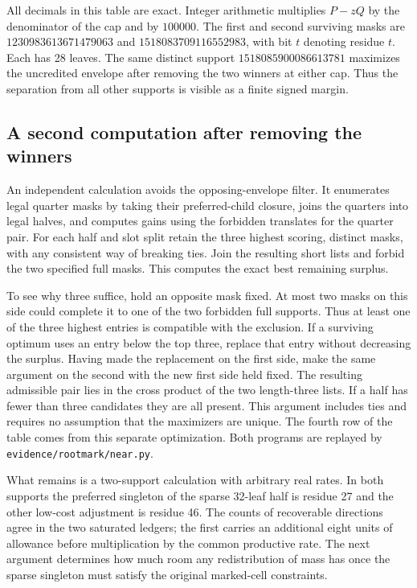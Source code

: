All decimals in this table are exact. Integer arithmetic multiplies \(P-zQ\) by the denominator of the cap and by \(100000\). The first and second surviving masks are \(1230983613671479063\) and \(1518083709116552983\), with bit \(t\) denoting residue \(t\). Each has 28 leaves. The same distinct support \(1518085900086613781\) maximizes the uncredited envelope after removing the two winners at either cap. Thus the separation from all other supports is visible as a finite signed margin.

\subsection{A second computation after removing the winners}

An independent calculation avoids the opposing-envelope filter. It enumerates legal quarter masks by taking their preferred-child closure, joins the quarters into legal halves, and computes gains using the forbidden translates for the quarter pair. For each half and slot split retain the three highest scoring, distinct masks, with any consistent way of breaking ties. Join the resulting short lists and forbid the two specified full masks. This computes the exact best remaining surplus.

To see why three suffice, hold an opposite mask fixed. At most two masks on this side could complete it to one of the two forbidden full supports. Thus at least one of the three highest entries is compatible with the exclusion. If a surviving optimum uses an entry below the top three, replace that entry without decreasing the surplus. Having made the replacement on the first side, make the same argument on the second with the new first side held fixed. The resulting admissible pair lies in the cross product of the two length-three lists. If a half has fewer than three candidates they are all present. This argument includes ties and requires no assumption that the maximizers are unique. The fourth row of the table comes from this separate optimization. Both programs are replayed by \texttt{evidence/rootmark/near.py}.

What remains is a two-support calculation with arbitrary real rates. In both supports the preferred singleton of the sparse 32-leaf half is residue 27 and the other low-cost adjustment is residue 46. The counts of recoverable directions agree in the two saturated ledgers; the first carries an additional eight units of allowance before multiplication by the common productive rate. The next argument determines how much room any redistribution of mass has once the sparse singleton must satisfy the original marked-cell constraints.
